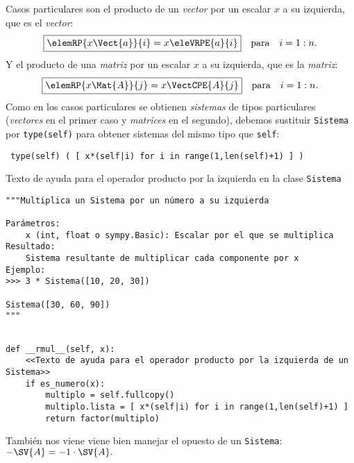 \documentclass[11pt]{report}
\begin{document}
Casos particulares son el producto de un \emph{vector} 
por un escalar \(x\) a su izquierda, que es el \emph{vector}:
\begin{displaymath}
  \fbox{\begin{math} 
      \elemRP{x\Vect{a}}{i}=x \eleVRPE{a}{i}
  \end{math}}\quad\text{para}\quad i=1:n.
\end{displaymath}
Y el producto de una \emph{matriz}  por un escalar \(x\) a su
izquierda, que es la \emph{matriz}:
\begin{displaymath}
  \fbox{\begin{math} 
      \elemRP{x\Mat{A}}{j}=x\VectCPE{A}{j}
    \end{math}}\quad\text{para}\quad i=1:n.
\end{displaymath}
Como en los casos particulares se obtienen \emph{sistemas} de tipos
particulares (\emph{vectores} en el primer caso y \emph{matrices} en el
segundo), debemos sustituir \texttt{Sistema} por \texttt{type(self)} para
obtener sistemas del mismo tipo que \texttt{self}:
\begin{center}
  \Verb/ type(self) ( [ x*(self|i) for i in range(1,len(self)+1) ] ) /
\end{center}

Texto de ayuda para el operador producto por la izquierda en la clase \texttt{Sistema}
\begin{verbatim}
"""Multiplica un Sistema por un número a su izquierda

Parámetros:
    x (int, float o sympy.Basic): Escalar por el que se multiplica
Resultado:
    Sistema resultante de multiplicar cada componente por x
Ejemplo:
>>> 3 * Sistema([10, 20, 30]) 

Sistema([30, 60, 90]) 
"""
\end{verbatim}

\begin{verbatim}

def __rmul__(self, x):
    <<Texto de ayuda para el operador producto por la izquierda de un Sistema>>
    if es_numero(x):
        multiplo = self.fullcopy()
        multiplo.lista = [ x*(self|i) for i in range(1,len(self)+1) ]
        return factor(multiplo)

\end{verbatim}

También nos viene viene bien manejar el opuesto de un \texttt{Sistema}:
\begin{math}
 -\SV{A}=-1\cdot\SV{A}.
\end{math}
\end{document}

